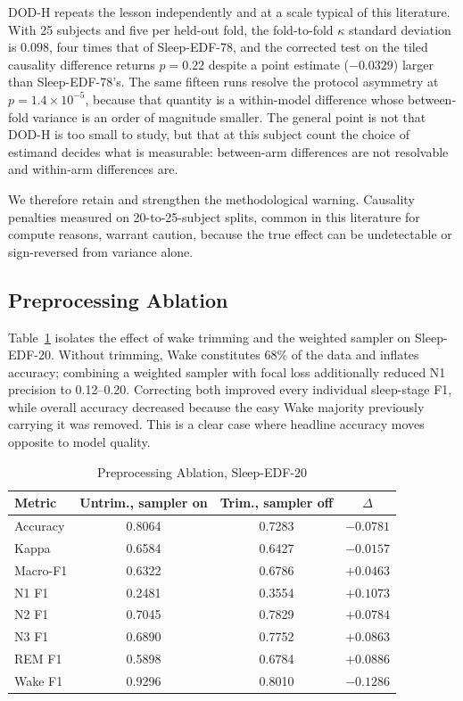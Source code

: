 \documentclass[conference]{IEEEtran}
\begin{document}
DOD-H repeats the lesson independently and at a scale typical of this literature. With 25 subjects
and five per held-out fold, the fold-to-fold $\kappa$ standard deviation is $0.098$, four times that
of Sleep-EDF-78, and the corrected test on the tiled causality difference returns $p = 0.22$ despite
a point estimate ($-0.0329$) larger than Sleep-EDF-78's. The same fifteen runs resolve the protocol
asymmetry at $p = 1.4\times10^{-5}$, because that quantity is a within-model difference whose
between-fold variance is an order of magnitude smaller. The general point is not that DOD-H is too
small to study, but that at this subject count the choice of estimand decides what is measurable:
between-arm differences are not resolvable and within-arm differences are.

We therefore retain and strengthen the methodological warning. Causality penalties measured on
20-to-25-subject splits, common in this literature for compute reasons, warrant caution, because the
true effect can be undetectable or sign-reversed from variance alone.

\subsection{Preprocessing Ablation}
\label{sec:preproc-ablation}

Table~\ref{tab:preproc} isolates the effect of wake trimming and the weighted sampler on
Sleep-EDF-20. Without trimming, Wake constitutes 68\% of the data and inflates accuracy; combining a
weighted sampler with focal loss additionally reduced N1 precision to 0.12--0.20. Correcting both
improved every individual sleep-stage F1, while overall accuracy decreased because the easy Wake
majority previously carrying it was removed. This is a clear case where headline accuracy moves
opposite to model quality.

\begin{table}[t]
\caption{Preprocessing Ablation, Sleep-EDF-20}
\label{tab:preproc}
\centering
\begin{tabular}{lccc}
\toprule
Metric & Untrim., sampler on & Trim., sampler off & $\Delta$ \\
\midrule
Accuracy & 0.8064 & 0.7283 & $-0.0781$ \\
Kappa    & 0.6584 & 0.6427 & $-0.0157$ \\
Macro-F1 & 0.6322 & 0.6786 & $+0.0463$ \\
N1 F1    & 0.2481 & 0.3554 & $+0.1073$ \\
N2 F1    & 0.7045 & 0.7829 & $+0.0784$ \\
N3 F1    & 0.6890 & 0.7752 & $+0.0863$ \\
REM F1   & 0.5898 & 0.6784 & $+0.0886$ \\
Wake F1  & 0.9296 & 0.8010 & $-0.1286$ \\
\bottomrule
\end{tabular}
\end{table}
\end{document}
